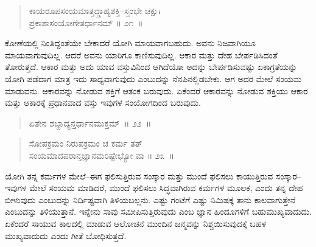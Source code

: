 \begin{verse}
ಕಾಯರೂಪಸಂಯಮಾತ್ತದ್ಗ್ರಾಹ್ಯಶಕ್ತಿ–ಸ್ತಂಭೇ ಚಕ್ಷುಃ\\ಪ್ರಕಾಶಾಸಂಯೋಗೇತರ್ಧಾನಮ್​ \hfill{॥ ೨೧~॥}
\end{verse}

\vspace{-0.4cm}



\vspace{0.2cm}

ಕೋಣೆಯಲ್ಲಿ ನಿಂತಿದ್ದಂತೆಯೇ ಬೇಕಾದರೆ ಯೋಗಿ ಮಾಯವಾಗಬಹುದು. ಅವನು ನಿಜವಾಗಿಯೂ ಮಾಯವಾಗುವುದಿಲ್ಲ. ಆದರೆ ಅವನು ಯಾರಿಗೂ ಕಾಣಿಸುವುದಿಲ್ಲ. ಆಕಾರ ಮತ್ತು ದೇಹ ಬೇರ್ಪಡಿಸಿದಂತೆ ತೋರುತ್ತದೆ. ಆಕಾರ ಮತ್ತು ಅದು ಯಾವ ವಸ್ತುವಿನಿಂದ ಆಗಿದೆಯೋ ಅದನ್ನು ಬೇರ್ಪಡಿಸುವಷ್ಟು ಏಕಾಗ್ರತೆಯನ್ನು ಯೋಗಿ ಪಡೆದಾಗ ಮಾತ್ರ ಇದು ಸಾಧ್ಯವಾಗುವುದು ಎಂಬುದನ್ನು ನೆನಪಿನಲ್ಲಿಡಬೇಕು. ಆಗ ಅದರ ಮೇಲೆ ಸಂಯಮ ಮಾಡುವನು. ಆಕಾರವನ್ನು ನೋಡುವ ಶಕ್ತಿಗೆ ಆತಂಕ ಬರುವುದು. ಏಕೆಂದರೆ ಆಕಾರವನ್ನು ನೋಡುವ ಶಕ್ತಿಯು ಆಕಾರ ಮತ್ತು ಆಕಾರಕ್ಕೆ ಪ್ರಧಾನವಾದ ವಸ್ತು ಇವುಗಳ ಸಂಯೋಗದಿಂದ ಬರುವುದು. 

\vspace{-0.3cm}

\begin{verse}
ಏತೇನ ಶಬ್ದಾದ್ಯನ್ತರ್ಧಾನಮುಕ್ತಮ್​~॥ ೨೨~॥
\end{verse}

\vspace{-0.4cm}


\vspace{-0.2cm}

\begin{verse}
ಸೋಪಕ್ರಮಂ ನಿರುಪಕ್ರಮಂ ಚ ಕರ್ಮ ತತ್​\\ಸಂಯಮಾದಪರಾನ್ತಜ್ಞಾನಮರಿಷ್ಟೇಭ್ಯೋ ವಾ \hfill{॥ ೨೩~॥}
\end{verse}

\vspace{-0.3cm}


\vspace{0.1cm}

ಯೋಗಿ ತನ್ನ ಕರ್ಮಗಳ ಮೇಲೆ–ಈಗ ಫಲಿಸುತ್ತಿರುವ ಸಂಸ್ಕಾರ ಮತ್ತು ಮುಂದೆ ಫಲಿಸಲು ಕಾಯುತ್ತಿರುವ ಸಂಸ್ಕಾರ–ಇವುಗಳ ಮೇಲೆ ಸಂಯಮ ಮಾಡಿದರೆ, ಮುಂದೆ ಫಲಿಸಲು ಸಿದ್ಧವಾಗಿರುವ ಕರ್ಮಗಳ ಮೂಲಕ, ಎಂದು ತನ್ನ ದೇಹ ಬೀಳುವುದು ಎಂಬುದನ್ನು ನಿರ್ದಿಷ್ಟವಾಗಿ ತಿಳಿಯಬಲ್ಲನು. ಎಷ್ಟು ಗಂಟೆಗೆ ಎಷ್ಟು ನಿಮಿಷಕ್ಕೆ ತಾನು ಕಾಲವಾಗುತ್ತೇನೆ ಎಂಬುದನ್ನು ತಿಳಿಯುತ್ತಾನೆ. ಇನ್ನೇನು ಸಾವು ಸಮೀಪಿಸುತ್ತಿರುವುದು ಎಂಬ ಜ್ಞಾನ ಹಿಂದೂಗಳಿಗೆ ಬಹುಮುಖ್ಯವಾದುದು. ಏಕೆಂದರೆ ಸಾಯುವ ಕಾಲದಲ್ಲಿ ಮಾಡುವ ಆಲೋಚನೆ ಮುಂದಿನ ಜನ್ಮವನ್ನು ನಿಶ್ಚಯಿಸುವುದಕ್ಕೆ ಬಹಳ ಮುಖ್ಯವಾದುದು ಎಂದು ಗೀತೆ ಬೋಧಿಸುತ್ತದೆ. 

